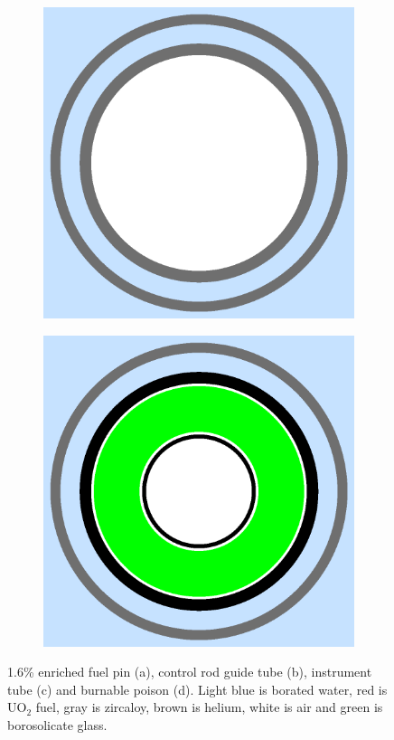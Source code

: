 \begin{figure}[h!]
\begin{subfigure}{.5\textwidth}
  \caption{}
  \label{fig:chap7-pin-crgt}
\end{subfigure}
\begin{subfigure}{.5\textwidth}
  \centering
  \includegraphics[width=0.9\linewidth]{figures/benchmarks/instr-tube}
  \caption{}
  \label{fig:chap7-instr-tube}
\end{subfigure}%
\begin{subfigure}{.5\textwidth}
  \centering
  \includegraphics[width=0.9\linewidth]{figures/benchmarks/burn-abs}
  \caption{}
  \label{fig:chap7-bp}
\end{subfigure}%
\caption[BEAVRS pin cell geometries]{1.6\% enriched fuel pin (a), control rod guide tube (b), instrument tube (c) and burnable poison (d). Light blue is borated water, red is UO$_2$ fuel, gray is zircaloy, brown is helium, white is air and green is borosolicate glass.}
\label{fig:chap7-pin-cells}
\end{figure}

